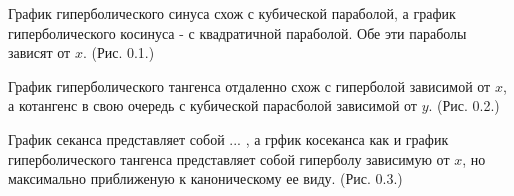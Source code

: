 График гиперболического синуса схож с кубической параболой, а график гиперболического косинуса - с квадратичной параболой. Обе эти параболы зависят от $x$. (Рис. 0.1.) 

График гиперболического тангенса отдаленно схож с гиперболой зависимой от $x$, а котангенс в свою очередь с кубической парасболой зависимой от $y$. (Рис. 0.2.)

График секанса представляет собой %
... , а грфик косеканса как и график гиперболического тангенса представляет собой гиперболу зависимую от $x$, но максимально приближеную к каноническому ее виду. (Рис. 0.3.)

